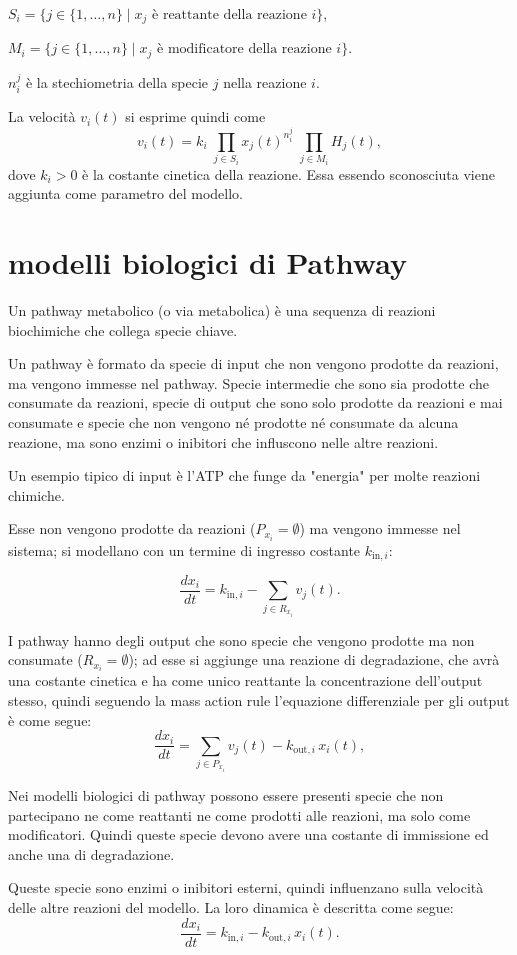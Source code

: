 $S_i=\{j\in\{1,\dots,n\}\mid x_j \text{ è reattante della reazione } i\}$,


$M_i=\{j\in\{1,\dots,n\}\mid x_j \text{ è modificatore della reazione } i\}$.

$n_i^j$ è la stechiometria della specie $j$ nella reazione $i$.

La velocità \(v_i(t)\) si esprime quindi come
\[
v_i(t)=k_i\;\prod_{j\in S_i} x_j(t)^{n_i^j}\;\prod_{j\in M_i} H_j(t),
\]
dove \(k_i>0\) è la costante cinetica della reazione. Essa essendo sconosciuta viene aggiunta
come parametro del modello.

\section{modelli biologici di Pathway}

Un pathway metabolico (o via metabolica)  è una sequenza di reazioni biochimiche che collega specie chiave.

Un pathway è formato da specie di input che non vengono prodotte da reazioni, ma vengono immesse nel pathway.
Specie intermedie che sono sia prodotte che consumate da reazioni, specie di output che sono solo prodotte da reazioni e mai consumate
e specie che non vengono né prodotte né consumate da alcuna reazione, ma sono enzimi o inibitori che influscono nelle altre reazioni.

Un esempio tipico di input è l'ATP che funge da "energia" per molte reazioni chimiche.

Esse non vengono prodotte da reazioni (\(P_{x_i}=\emptyset\)) ma vengono immesse nel sistema; si modellano con un termine di ingresso costante \(k_{\mathrm{in},i}\):

\[
\frac{dx_i}{dt}=k_{\mathrm{in},i} - \sum_{j\in R_{x_i}} v_j(t).
\]

I pathway hanno degli output che sono specie che vengono prodotte ma non consumate (\(R_{x_i}=\emptyset\)); ad esse si aggiunge una reazione di degradazione, che avrà una costante cinetica e ha come unico reattante
la concentrazione dell'output stesso, quindi seguendo la mass action rule l'equazione differenziale per gli output è come segue:
\[
\frac{dx_i}{dt}=\sum_{j\in P_{x_i}} v_j(t) - k_{\mathrm{out},i}\,x_i(t),
\]

Nei modelli biologici di pathway possono essere presenti specie che non partecipano ne come reattanti ne come prodotti alle reazioni, ma solo come
modificatori. Quindi queste specie devono avere una costante di immissione ed anche una di degradazione.

Queste specie sono enzimi o inibitori esterni, quindi influenzano sulla velocità delle altre reazioni del modello. La loro dinamica è descritta come segue:
\[
\frac{dx_i}{dt}=k_{\mathrm{in},i}-k_{\mathrm{out},i}\,x_i(t).
\]

